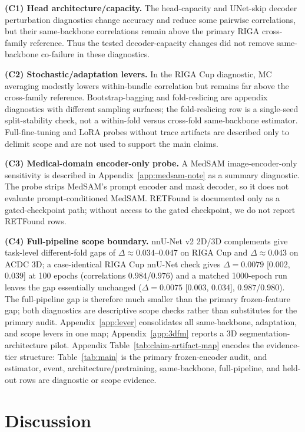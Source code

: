 \documentclass{article}
\begin{document}
\textbf{(C1) Head architecture/capacity.} The head-capacity and UNet-skip decoder perturbation diagnostics change accuracy and reduce some pairwise correlations, but their same-backbone correlations remain above the primary RIGA cross-family reference. Thus the tested decoder-capacity changes did not remove same-backbone co-failure in these diagnostics.

\textbf{(C2) Stochastic/adaptation levers.} In the RIGA Cup diagnostic, MC averaging modestly lowers within-bundle correlation but remains far above the cross-family reference. Bootstrap-bagging and fold-reslicing are appendix diagnostics with different sampling surfaces; the fold-reslicing row is a single-seed split-stability check, not a within-fold versus cross-fold same-backbone estimator. Full-fine-tuning and LoRA probes without trace artifacts are described only to delimit scope and are not used to support the main claims.

\textbf{(C3) Medical-domain encoder-only probe.} A MedSAM image-encoder-only sensitivity is described in Appendix~\ref{app:medsam-note} as a summary diagnostic. The probe strips MedSAM's prompt encoder and mask decoder, so it does not evaluate prompt-conditioned MedSAM. RETFound is documented only as a gated-checkpoint path; without access to the gated checkpoint, we do not report RETFound rows.

\textbf{(C4) Full-pipeline scope boundary.} nnU-Net v2 2D/3D complements give task-level different-fold gaps of $\Delta{\approx}0.034$--$0.047$ on RIGA Cup and $\Delta{\approx}0.043$ on ACDC 3D; a case-identical RIGA Cup nnU-Net check gives $\Delta{=}0.0079$ [0.002, 0.039] at 100 epochs (correlations $0.984$/$0.976$) and a matched 1000-epoch run leaves the gap essentially unchanged ($\Delta{=}0.0075$ [0.003, 0.034], $0.987$/$0.980$). The full-pipeline gap is therefore much smaller than the primary frozen-feature gap; both diagnostics are descriptive scope checks rather than substitutes for the primary audit. Appendix~\ref{app:lever} consolidates all same-backbone, adaptation, and scope levers in one map; Appendix~\ref{app:3dfm} reports a 3D segmentation-architecture pilot. Appendix Table~\ref{tab:claim-artifact-map} encodes the evidence-tier structure: Table~\ref{tab:main} is the primary frozen-encoder audit, and estimator, event, architecture/pretraining, same-backbone, full-pipeline, and held-out rows are diagnostic or scope evidence.

\section{Discussion}
\label{sec:discussion}
\end{document}
